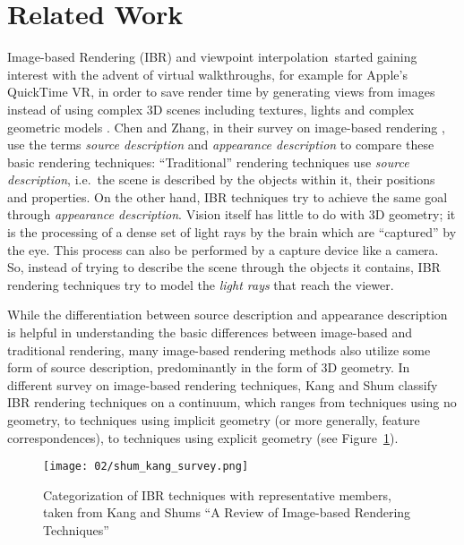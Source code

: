 \section{Related Work}\label{sec:related_work}
Image-based Rendering (IBR) and viewpoint interpolation\footnotemark\ started gaining interest with the advent of virtual walkthroughs, for example for Apple's QuickTime\textsuperscript{\textregistered} VR, in order to save render time by generating views from images instead of using complex 3D scenes including textures, lights and complex geometric models \cite{quicktime}.
Chen and Zhang, in their survey on image-based rendering \cite{survey2004}, use the terms \emph{source description} and \emph{appearance description} to compare these basic rendering techniques: ``Traditional'' rendering techniques use \emph{source description}, i.e.\ the scene is described by the objects within it, their positions and properties. On the other hand, IBR techniques try to achieve the same goal through \emph{appearance description}. Vision itself has little to do with 3D geometry; it is the processing of a dense set of light rays by the brain which are ``captured'' by the eye. This process can also be performed by a capture device like a camera. So, instead of trying to describe the scene through the objects it contains, IBR rendering techniques try to model the \emph{light rays} that reach the viewer. 


While the differentiation between source description and appearance description is helpful in understanding the basic differences between image-based and traditional rendering, many image-based rendering methods also utilize some form of source description, predominantly in the form of 3D geometry. In different survey on image-based rendering techniques, Kang and Shum \cite{survey2000} classify IBR rendering techniques on a continuum, which ranges from techniques using no geometry, to techniques using implicit geometry (or more generally, feature correspondences), to techniques using explicit geometry (see Figure~\ref{fig:survey_categorization}).

\begin{figure}
		\centering
		\texttt{[image: 02/shum\_kang\_survey.png]}
    \caption[Categorization of IBR techniques from \cite{survey2000}]{Categorization of IBR techniques with representative members, taken from Kang and Shums ``A Review of Image-based Rendering Techniques''\cite{survey2000}}
		\label{fig:survey_categorization}
\end{figure}

